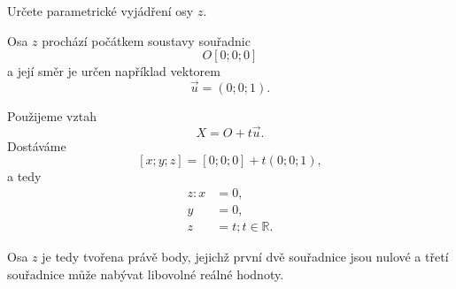 \begin{example}
    \label{exa:Parametric_z_axis}
    Určete parametrické vyjádření osy $z$.

    Osa $z$ prochází počátkem soustavy souřadnic
    \[
        O[0;0;0]
    \]
    a její směr je určen například vektorem
    \[
        \vec{u}=(0;0;1).
    \]

    Použijeme vztah
    \[
        X=O+t\vec{u}.
    \]
    Dostáváme
    \[
        [x;y;z]
        =
        [0;0;0]+t(0;0;1),
    \]
    a tedy
    \[
        \begin{aligned}
            z: x&=0,\\
            y&=0,\\
            z&=t; t\in\mathbb{R}.
        \end{aligned}
    \]

    Osa $z$ je tedy tvořena právě body, jejichž první dvě souřadnice
    jsou nulové a třetí souřadnice může nabývat libovolné reálné hodnoty.
\end{example}

